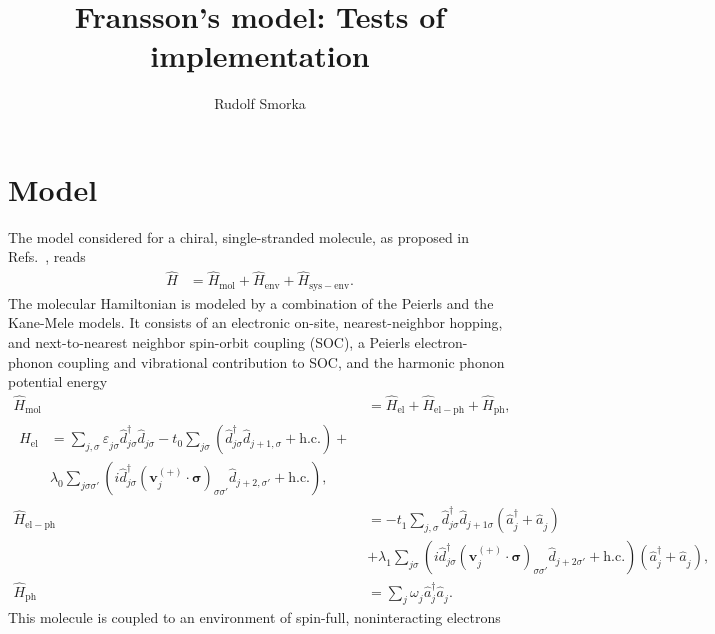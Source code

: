 \documentclass{article}
\renewcommand{\vec}[1]{\mathbf{#1}}
\newcommand{\pdagger}{{\phantom{\dagger}}}
\begin{document}
	
\title{Fransson's model: Tests of implementation}
\author{Rudolf Smorka}
\maketitle
\section{Model}
The model considered for a chiral, single-stranded molecule, as proposed in Refs.~\cite{fransson2019chirality,fransson2020vibrational,Fransson_2021,fransson2021charge}, reads
\begin{align}
	\hat{H} &= \hat{H}_\mathrm{mol} + \hat{H}_\mathrm{env} + \hat{H}_\mathrm{sys-env}.
\end{align} 
The molecular Hamiltonian is modeled by a combination of the  Peierls and the Kane-Mele models. It consists of an electronic on-site, nearest-neighbor hopping, and next-to-nearest neighbor spin-orbit coupling (SOC), a Peierls electron-phonon coupling and vibrational contribution to SOC, and the harmonic phonon potential energy 
\begin{align}
	\hat{H}_\mathrm{mol} &= \hat{H}_\mathrm{el} + \hat{H}_\mathrm{el-ph} + \hat{H}_\mathrm{ph},\\
	\begin{split}
		\hat{H}_\mathrm{el} &= \sum_{j,\sigma} \varepsilon_{j\sigma}^\pdagger \hat{d}_{j\sigma}^\dagger \hat{d}_{j\sigma}^\pdagger - t_0 \sum_{j\sigma} (\hat{d}_{j\sigma}^\dagger \hat{d}_{j+1,\sigma}^\pdagger + \mathrm{h.c.}) +\\& \lambda_0^\pdagger\sum_{j\sigma\sigma'} (i\hat{d}_{j\sigma}^\dagger (\vec{v}_j^{(+)}\cdot \bm{\sigma})_{\sigma\sigma'}^\pdagger \hat{d}_{j+2,\sigma'}^\pdagger + \mathrm{h.c.}),
	\end{split}\\
	\hat{H}_\mathrm{el-ph} &= - t_1^\pdagger \sum_{j,\sigma}  \hat{d}_{j\sigma}^\dagger \hat{d}_{j+1\sigma}^\pdagger (\hat{a}_{j}^\dagger + \hat{a}_{j}^\pdagger) \\ & + \lambda_1^\pdagger\sum_{j\sigma} (i \hat{d}_{j\sigma}^\dagger (\vec{v}_j^{(+)} \cdot \bm{\sigma})_{\sigma\sigma'}^\pdagger \hat{d}_{j+2\sigma'}^\pdagger +\mathrm{h.c.})(\hat{a}_{j}^\dagger + \hat{a}_{j}^\pdagger),\label{eq:HelPh}\\
	\hat{H}_\mathrm{ph} &= \sum_{j} \omega_{j}^\pdagger \hat{a}_{j}^\dagger \hat{a}_{j}^\pdagger.
	 \label{eq:Hamiltonian_el_Fransson} 
\end{align}
This molecule is coupled to an environment of spin-full, noninteracting electrons
\end{document}

